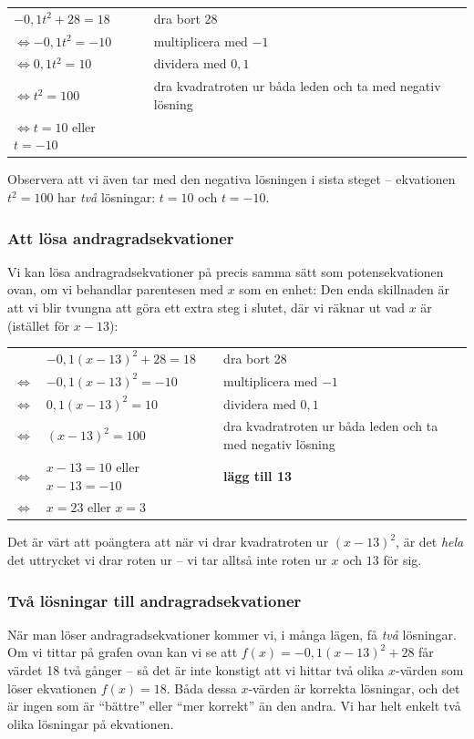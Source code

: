 \begin{tabular}{l|p{4.7cm}}
  $-0,1t^2+28=18$ & dra bort 28 \\
  $\Leftrightarrow -0,1t^2=-10$ & multiplicera med $-1$ \\
  $\Leftrightarrow 0,1t^2=10$ & dividera med $0,1$ \\
  $\Leftrightarrow t^2=100$ & dra kvadratroten ur båda leden och ta med negativ lösning \\
  $\Leftrightarrow t=10$ eller $t=-10$
\end{tabular}

Observera att vi även tar med den negativa lösningen i sista steget -- ekvationen $t^2=100$ har \emph{två} lösningar: $t=10$ och $t=-10$.

\subsubsection{Att lösa andragradsekvationer}

Vi kan lösa andragradsekvationer på precis samma sätt som potensekvationen ovan, om vi behandlar parentesen med $x$ som en enhet:
Den enda skillnaden är att vi blir tvungna att göra ett extra steg i slutet, där vi räknar ut vad $x$ är (istället för $x-13$):

\begin{tabular}{r p{5cm}|p{4.7cm}}
  & $-0,1(x-13)^2+28=18$ & dra bort 28 \\
  $\Leftrightarrow$ & $-0,1(x-13)^2=-10$ & multiplicera med $-1$ \\
  $\Leftrightarrow$ & $0,1(x-13)^2=10$ & dividera med $0,1$ \\
  $\Leftrightarrow$ & $(x-13)^2=100$ & dra kvadratroten ur båda leden och ta med negativ lösning \\
  $\Leftrightarrow$ & $x-13=10$ eller $x-13=-10$ & \textbf{lägg till 13} \\
  $\Leftrightarrow$ & $x = 23$ eller $x=3$  
\end{tabular}

Det är värt att poängtera att när vi drar kvadratroten ur $(x-13)^2$, är det \emph{hela} det uttrycket vi drar roten ur -- vi tar alltså inte roten ur $x$ och $13$ för sig.

\subsubsection{Två lösningar till andragradsekvationer}

När man löser andragradsekvationer kommer vi, i många lägen, få \emph{två} lösningar.
Om vi tittar på grafen ovan kan vi se att $f(x) = -0,1(x-13)^2+28$ får värdet 18 två gånger -- så det är inte konstigt att vi hittar två olika $x$-värden som löser ekvationen $f(x)=18$.
Båda dessa $x$-värden är korrekta lösningar, och det är ingen som är ``bättre'' eller ``mer korrekt'' än den andra.
Vi har helt enkelt två olika lösningar på ekvationen.


